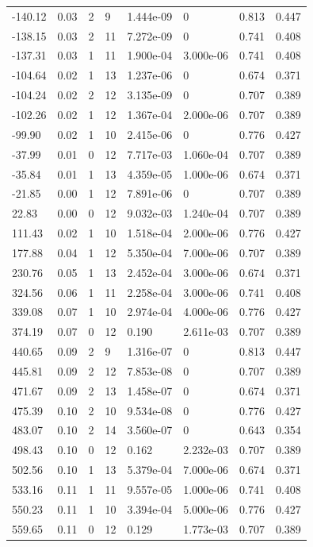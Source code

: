 \documentclass[preview]{standalone}
\begin{document}
{{\begin{tabular}{L{1.2cm}C{1.2cm} C{0.3cm}C{0.5cm} C{1.4cm}C{1.4cm} C{1.4cm}C{1.4cm}}
  -140.12  &  0.03  & 2     &  9 &  1.444e-09  & 0  & 0.813 &  0.447   \\ 
  -138.15  &  0.03  & 2     & 11 &  7.272e-09  & 0  & 0.741 &  0.408   \\ 
  -137.31  &  0.03  & 1     & 11 &  1.900e-04  & 3.000e-06  & 0.741 &  0.408   \\ 
  -104.64  &  0.02  & 1     & 13 &  1.237e-06  & 0  & 0.674 &  0.371   \\ 
  -104.24  &  0.02  & 2     & 12 &  3.135e-09  & 0  & 0.707 &  0.389   \\ 
  -102.26  &  0.02  & 1     & 12 &  1.367e-04  & 2.000e-06  & 0.707 &  0.389   \\ 
  -99.90  &  0.02  & 1     & 10 &  2.415e-06  & 0  & 0.776 &  0.427   \\ 
  -37.99  &  0.01  & 0     & 12 &  7.717e-03  & 1.060e-04  & 0.707 &  0.389   \\ 
  -35.84  &  0.01  & 1     & 13 &  4.359e-05  & 1.000e-06  & 0.674 &  0.371   \\ 
  -21.85  &  0.00  & 1     & 12 &  7.891e-06  & 0  & 0.707 &  0.389   \\ 
  22.83  &  0.00  & 0     & 12 &  9.032e-03  & 1.240e-04  & 0.707 &  0.389   \\ 
  111.43  &  0.02  & 1     & 10 &  1.518e-04  & 2.000e-06  & 0.776 &  0.427   \\ 
  177.88  &  0.04  & 1     & 12 &  5.350e-04  & 7.000e-06  & 0.707 &  0.389   \\ 
  230.76  &  0.05  & 1     & 13 &  2.452e-04  & 3.000e-06  & 0.674 &  0.371   \\ 
  324.56  &  0.06  & 1     & 11 &  2.258e-04  & 3.000e-06  & 0.741 &  0.408   \\ 
  339.08  &  0.07  & 1     & 10 &  2.974e-04  & 4.000e-06  & 0.776 &  0.427   \\ 
  374.19  &  0.07  & 0     & 12 &  0.190  & 2.611e-03  & 0.707 &  0.389   \\ 
  440.65  &  0.09  & 2     &  9 &  1.316e-07  & 0  & 0.813 &  0.447   \\ 
  445.81  &  0.09  & 2     & 12 &  7.853e-08  & 0  & 0.707 &  0.389   \\ 
  471.67  &  0.09  & 2     & 13 &  1.458e-07  & 0  & 0.674 &  0.371   \\ 
  475.39  &  0.10  & 2     & 10 &  9.534e-08  & 0  & 0.776 &  0.427   \\ 
  483.07  &  0.10  & 2     & 14 &  3.560e-07  & 0  & 0.643 &  0.354   \\ 
  498.43  &  0.10  & 0     & 12 &  0.162  & 2.232e-03  & 0.707 &  0.389   \\ 
  502.56  &  0.10  & 1     & 13 &  5.379e-04  & 7.000e-06  & 0.674 &  0.371   \\ 
  533.16  &  0.11  & 1     & 11 &  9.557e-05  & 1.000e-06  & 0.741 &  0.408   \\ 
  550.23  &  0.11  & 1     & 10 &  3.394e-04  & 5.000e-06  & 0.776 &  0.427   \\ 
  559.65  &  0.11  & 0     & 12 &  0.129  & 1.773e-03  & 0.707 &  0.389   \\ 
\hline 
\end{tabular} 

}}
\end{document}
